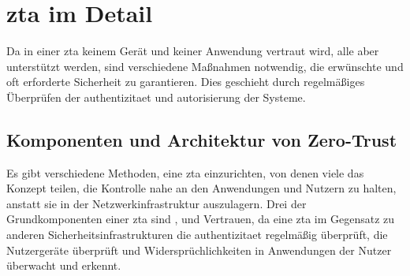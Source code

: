 \newpage
\section[Zero-Trust Architektur im Detail]{\ac{zta} im Detail}\label{sec:zta-im-detail}
Da in einer \ac{zta} keinem Gerät und keiner Anwendung vertraut wird, alle aber unterstützt werden, sind verschiedene Maßnahmen notwendig, die erwünschte und oft erforderte Sicherheit zu garantieren.
Dies geschieht durch regelmäßiges Überprüfen der \gls{authentizitaet} und \gls{autorisierung} der Systeme.\autocite[\vglf][]{dsilvia-2021}

\subsection{Komponenten und Architektur von Zero-Trust}\label{subsec:komponenten-und-architektur-von-zero-trust}
Es gibt verschiedene Methoden, eine \ac{zta} einzurichten, von denen viele das Konzept teilen, die Kontrolle nahe an den Anwendungen und Nutzern zu halten, anstatt sie in der Netzwerkinfrastruktur auszulagern.\autocite[\vglf][]{buck-2021}
Drei der Grundkomponenten einer \ac{zta} sind ,  und Vertrauen, da eine \ac{zta} im Gegensatz zu anderen Sicherheitsinfrastrukturen die \gls{authentizitaet} regelmäßig überprüft, die Nutzergeräte überprüft und Widersprüchlichkeiten in Anwendungen der Nutzer überwacht und erkennt.\autocite[\vglf][]{dsilvia-2021}

